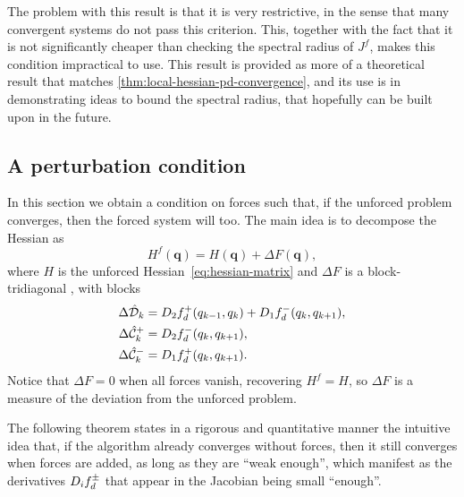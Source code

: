 The problem with this result is that it is very restrictive, in the sense that many convergent systems do not pass this criterion. This, together with the fact that it is not significantly cheaper than checking the spectral radius of $J^f$, makes this condition impractical to use. This result is provided as more of a theoretical result that matches \cref{thm:local-hessian-pd-convergence}, and its use is in demonstrating ideas to bound the spectral radius, that hopefully can be built upon in the future.

\subsection{A perturbation condition}

In this section we obtain a condition on forces such that, if the unforced problem converges, then the forced system will too. The main idea is to decompose the Hessian as
\begin{equation}
	H^f(\mathbf{q}) = H(\mathbf{q}) + \Delta F(\mathbf{q}),
	\label{eq:hessian-matrix-forced-relative}
\end{equation}
where $H$ is the unforced Hessian~\eqref{eq:hessian-matrix} and $\Delta F$ is a block-tridiagonal , with blocks
\begin{align*}
	\Delta\hat{\mathcal{D}}_k   & = D_{2} f_d^+(q_{k-1}, q_k) + D_{1} f_d^-(q_k, q_{k+1}), \\
	\Delta\hat{\mathcal{C}}^+_k & = D_{2} f_d^-(q_k, q_{k+1}),                                \\
	\Delta\hat{\mathcal{C}}^-_k & = D_{1} f_d^+(q_k, q_{k+1}).
\end{align*}
Notice that $\Delta F = 0$ when all forces vanish, recovering $H^f = H$, so $\Delta F$ is a measure of the deviation from the unforced problem.

The following theorem states in a rigorous and quantitative manner the intuitive idea that, if the algorithm already converges without forces, then it still converges when forces are added, as long as they are ``weak enough'', which manifest as the derivatives $D_{i} f_d^\pm$ that appear in the Jacobian being small ``enough''.

